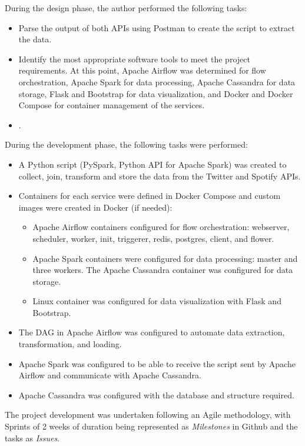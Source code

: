 \nonzeroparskip During the design phase, the author performed the following tasks:
\begin{itemize}
	\item Parse the output of both APIs using Postman to create the script to extract the data.
	\item Identify the most appropriate software tools to meet the project requirements. At this point, Apache Airflow was determined for flow orchestration, Apache Spark for data processing, Apache Cassandra for data storage, Flask and Bootstrap for data visualization, and Docker and Docker Compose for container management of the services.
	\item .
\end{itemize}

\nonzeroparskip During the development phase, the following tasks were performed:
\begin{itemize}
	\item A Python script (PySpark, Python API for Apache Spark) was created to collect, join, transform and store the data from the Twitter and Spotify APIs.
	\item Containers for each service were defined in Docker Compose and custom images were created in Docker (if needed):
	\begin{itemize}
		\item Apache Airflow containers configured for flow orchestration: webserver, scheduler, worker, init, triggerer, redis, postgres, client, and flower.
		\item Apache Spark containers were configured for data processing: master and three workers.
The Apache Cassandra container was configured for data storage.
		\item Linux container was configured for data visualization with Flask and Bootstrap.
	\end{itemize}
	\item The DAG in Apache Airflow was configured to automate data extraction, transformation, and loading.
	\item Apache Spark was configured to be able to receive the script sent by Apache Airflow and communicate with Apache Cassandra.
	\item Apache Cassandra was configured with the database and structure required.
\end{itemize}

\nonzeroparskip The project development was undertaken following an Agile methodology, with Sprints of 2 weeks of duration being represented as \textit{Milestones} in Github and the tasks as \textit{Issues}.